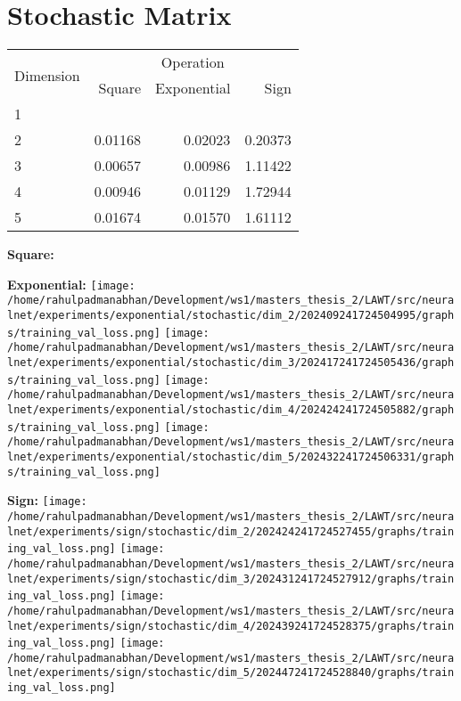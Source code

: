 \documentclass{article}
\begin{document}
\pagebreak
\section{Stochastic Matrix}
\begin{tabular}{@{}lrrr@{}}
\toprule
\multirow{2}{*}{Dimension} & \multicolumn{3}{c}{Operation} \\
\cmidrule(l){2-4}
& Square & Exponential & Sign \\
\midrule
1 & & & \\
2 & 0.01168 & 0.02023 & 0.20373 \\
3 & 0.00657 & 0.00986 & 1.11422 \\
4 & 0.00946 & 0.01129 & 1.72944 \\
5 & 0.01674 & 0.01570 & 1.61112 \\
\bottomrule
\end{tabular}

\textbf{Square:}

\textbf{Exponential:}
\texttt{[image: /home/rahulpadmanabhan/Development/ws1/masters\_thesis\_2/LAWT/src/neuralnet/experiments/exponential/stochastic/dim\_2/202409241724504995/graphs/training\_val\_loss.png]}
\texttt{[image: /home/rahulpadmanabhan/Development/ws1/masters\_thesis\_2/LAWT/src/neuralnet/experiments/exponential/stochastic/dim\_3/202417241724505436/graphs/training\_val\_loss.png]}
\texttt{[image: /home/rahulpadmanabhan/Development/ws1/masters\_thesis\_2/LAWT/src/neuralnet/experiments/exponential/stochastic/dim\_4/202424241724505882/graphs/training\_val\_loss.png]}
\texttt{[image: /home/rahulpadmanabhan/Development/ws1/masters\_thesis\_2/LAWT/src/neuralnet/experiments/exponential/stochastic/dim\_5/202432241724506331/graphs/training\_val\_loss.png]}

\textbf{Sign:}
\texttt{[image: /home/rahulpadmanabhan/Development/ws1/masters\_thesis\_2/LAWT/src/neuralnet/experiments/sign/stochastic/dim\_2/202424241724527455/graphs/training\_val\_loss.png]}
\texttt{[image: /home/rahulpadmanabhan/Development/ws1/masters\_thesis\_2/LAWT/src/neuralnet/experiments/sign/stochastic/dim\_3/202431241724527912/graphs/training\_val\_loss.png]}
\texttt{[image: /home/rahulpadmanabhan/Development/ws1/masters\_thesis\_2/LAWT/src/neuralnet/experiments/sign/stochastic/dim\_4/202439241724528375/graphs/training\_val\_loss.png]}
\texttt{[image: /home/rahulpadmanabhan/Development/ws1/masters\_thesis\_2/LAWT/src/neuralnet/experiments/sign/stochastic/dim\_5/202447241724528840/graphs/training\_val\_loss.png]}
\end{document}
